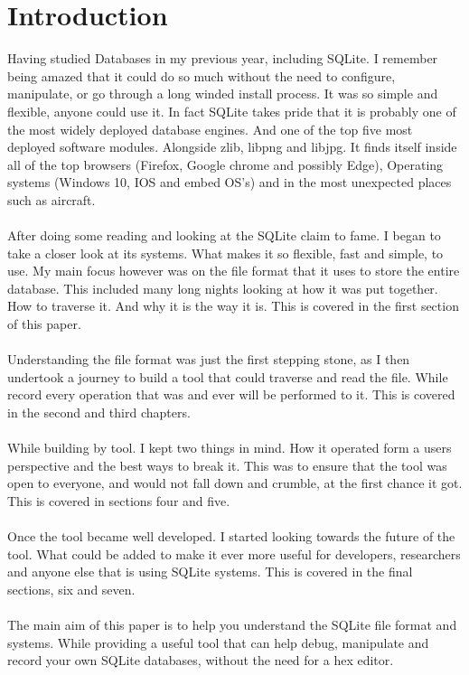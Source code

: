 \section*{Introduction}
\label{sec:introduction}

Having studied Databases in my previous year, including SQLite. I remember being amazed that it could do so much without the need to configure, manipulate, or go through a long winded install process. It was so simple and flexible, anyone could use it. In fact SQLite takes pride that it is probably one of the most widely deployed database engines. And one of the top five most deployed software modules. Alongside zlib, libpng and libjpg. It finds itself inside all of the top browsers (Firefox, Google chrome and possibly Edge), Operating systems (Windows 10, IOS and embed OS's) and in the most unexpected places such as aircraft.
\\\\
After doing some reading and looking at the SQLite claim to fame. I began to take a closer look at its systems. What makes it so flexible, fast and simple, to use. My main focus however was on the file format that it uses to store the entire database. This included many long nights looking at how it was put together. How to traverse it. And why it is the way it is. This is covered in the first section of this paper.
\\\\
Understanding the file format was just the first stepping stone, as I then undertook a journey to build a tool that could traverse and read the file. While record every operation that was and ever will be performed to it. This is covered in the second and third chapters.
\\\\
While building by tool. I kept two things in mind. How it operated form a users perspective and the best ways to break it. This was to ensure that the tool was open to everyone, and would not fall down and crumble, at the first chance it got. This is covered in sections four and five. 
\\\\
Once the tool became well developed. I started looking towards the future of the tool. What could be added to make it ever more useful for developers, researchers and anyone else that is using SQLite systems. This is covered in the final sections, six and seven.
\\\\
The main aim of this paper is to help you understand the SQLite file format and systems. While providing a useful tool that can help debug, manipulate and record your own SQLite databases, without the need for a hex editor.